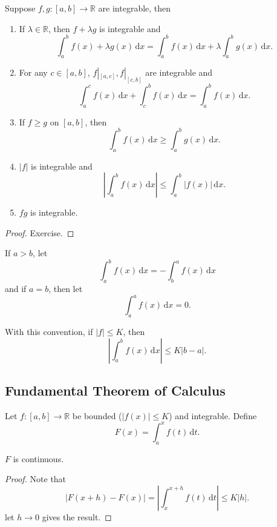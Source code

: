 \begin{proposition}
    Suppose $f,g:[a,b]\to\mathbb R$ are integrable, then
    \begin{enumerate}
        \item If $\lambda\in\mathbb R$, then $f+\lambda g$ is integrable and
        $$\int_a^bf(x)+\lambda g(x)\,\mathrm dx=\int_a^bf(x)\,\mathrm dx+\lambda\int_a^bg(x)\,\mathrm dx.$$
        \item For any $c\in [a,b]$, $f|_{[a,c]},f|_{[c,b]}$ are integrable and
        $$\int_a^cf(x)\,\mathrm dx+\int_c^bf(x)\,\mathrm dx=\int_a^bf(x)\,\mathrm dx.$$
        \item If $f\ge g$ on $[a,b]$, then
        $$\int_a^bf(x)\,\mathrm dx\ge\int_a^bg(x)\,\mathrm dx.$$
        \item $|f|$ is integrable and
        $$\left|\int_a^bf(x)\,\mathrm dx\right|\le\int_a^b|f(x)|\,\mathrm dx.$$
        \item $fg$ is integrable.
    \end{enumerate}
\end{proposition}
\begin{proof}
    Exercise.
\end{proof}
\begin{notation}
    If $a>b$, let 
    \[
        \int_{a}^{b} f(x) \,\mathrm{d}x = - \int_{b}^{a} f(x) \,\mathrm{d}x
    \]
    and if $a=b$, then let 
    \[
        \int_{a}^{a} f(x) \,\mathrm{d}x=0.
    \]
\end{notation}
With this convention, if $|f|\le K$, then 
\[
    \left| \int_{a}^{b} f(x) \,\mathrm{d}x \right| \le K|b-a|.
\]

\subsection{Fundamental Theorem of Calculus}
Let $f:[a,b]\to \mathbb{R} $ be bounded ($ |f(x)|\le K $) and integrable. Define 
\[
    F(x) = \int_{a}^{x} f(t) \,\mathrm{d}t.
\]
\begin{theorem}\label{thm:5.7}
    $F$ is continuous.
\end{theorem}
\begin{proof}
    Note that 
    \[
        \left| F(x+h)-F(x) \right|  = \left| \int_{x}^{x+h} f(t) \,\mathrm{d}t \right| \le K|h|.
    \]
    let $h\to 0$ gives the result.
\end{proof}

